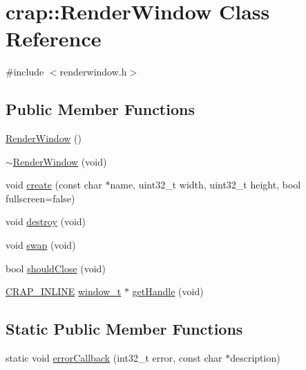 \hypertarget{classcrap_1_1_render_window}{}\section{crap\+:\+:Render\+Window Class Reference}
\label{classcrap_1_1_render_window}


{\ttfamily \#include $<$renderwindow.\+h$>$}

\subsection*{Public Member Functions}
\begin{DoxyCompactItemize}
\item 
\hyperlink{classcrap_1_1_render_window_af052082b68783a9faf24727bb5811382}{Render\+Window} ()
\item 
\hyperlink{classcrap_1_1_render_window_a0993f941869dcaafb78d728d6c827cba}{$\sim$\+Render\+Window} (void)
\item 
void \hyperlink{classcrap_1_1_render_window_acd515f9aa85e4c304b1020db79d55479}{create} (const char $\ast$name, uint32\+\_\+t width, uint32\+\_\+t height, bool fullscreen=false)
\item 
void \hyperlink{classcrap_1_1_render_window_ac7d067d0a8342df56c21e08cb265582d}{destroy} (void)
\item 
void \hyperlink{classcrap_1_1_render_window_a07be14e130cc5e09c5eb07a037dc45c3}{swap} (void)
\item 
bool \hyperlink{classcrap_1_1_render_window_ad63e3829f4db21d2fe280f72e5aba15b}{should\+Close} (void)
\item 
\hyperlink{config__x86_8h_a5a40526b8d842e7ff731509998bb0f1c}{C\+R\+A\+P\+\_\+\+I\+N\+L\+I\+N\+E} \hyperlink{namespacecrap_a3917356677c911215fe8f50465f335bf}{window\+\_\+t} $\ast$ \hyperlink{classcrap_1_1_render_window_a0b8119c9694f72f3ce1f10e6dc593872}{get\+Handle} (void)
\end{DoxyCompactItemize}
\subsection*{Static Public Member Functions}
\begin{DoxyCompactItemize}
\item 
static void \hyperlink{classcrap_1_1_render_window_a673d5bcefee1ad2145bf916edd74a7db}{error\+Callback} (int32\+\_\+t error, const char $\ast$description)
\end{DoxyCompactItemize}


